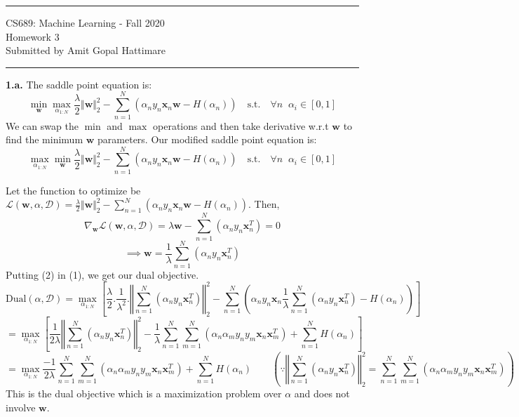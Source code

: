 \documentclass[11pt]{article}
\newcommand{\mbf}[1]{{\mathbf{#1}}}
\begin{document}
{\centering
  \rule{6.3in}{2pt}
  \vspace{1em}
  {\Large
    CS689: Machine Learning - Fall 2020\\
    Homework 3\\
  }
  \vspace{1em}
  Submitted by Amit Gopal Hattimare \\
  \vspace{0.1em}
  \rule{6.3in}{1.5pt}
}
\vspace{1pc}

\textbf{1.a.}
The saddle point equation is:
$$
	\min_{\mbf{w}}\max_{\alpha_{1:N}} \frac{\lambda}{2} \Vert\mbf{w}\Vert_2^2 - \sum_{n=1}^{N}(\alpha_n y_n \mbf{x}_n \mbf{w} - H(\alpha_n)) \quad \mbox{s.t.} \quad \forall n \;\; \alpha_i \in [0, 1]  
$$
We can swap the $\min$ and $\max$ operations and then take derivative w.r.t $\mbf{w}$ to find the minimum $\mbf{w}$ parameters. Our modified saddle point equation is:
\begin{equation}
	\max_{\alpha_{1:N}} \min_{\mbf{w}} \frac{\lambda}{2} \Vert\mbf{w}\Vert_2^2 - \sum_{n=1}^{N}(\alpha_n y_n \mbf{x}_n \mbf{w} - H(\alpha_n)) \quad \mbox{s.t.} \quad \forall n \;\; \alpha_i \in [0, 1]  
\end{equation}

Let the function to optimize be $\mathcal{L}(\mbf{w}, \alpha, \mathcal{D}) = \frac{\lambda}{2} \Vert\mbf{w}\Vert_2^2 - \sum_{n=1}^{N}(\alpha_n y_n \mbf{x}_n \mbf{w} - H(\alpha_n))$. Then,
$$
	\nabla_\mbf{w}\mathcal{L}(\mbf{w}, \alpha, \mathcal{D}) = \lambda\mbf{w} - \sum_{n=1}^{N}(\alpha_n y_n \mbf{x}_n^T) = 0
$$
\begin{equation}
	\implies \mbf{w} = \frac{1}{\lambda} \sum_{n=1}^{N}(\alpha_n y_n \mbf{x}_n^T)
\end{equation}
Putting (2) in (1), we get our dual objective.
$$
	\mbox{Dual}(\alpha, \mathcal{D}) = \max_{\alpha_{1:N}} \left[ \frac{\lambda}{2}.\frac{1}{\lambda^2}.\left\Vert \sum_{n=1}^{N}(\alpha_n y_n \mbf{x}_n^T) \right\Vert_2^2 - \sum_{n=1}^{N}\left( \alpha_n y_n \mbf{x}_n \frac{1}{\lambda} \sum_{n=1}^{N}(\alpha_n y_n \mbf{x}_n^T) - H(\alpha_n) \right) \right]
$$
$$
	= \max_{\alpha_{1:N}} \left[ \frac{1}{2\lambda} \left\Vert \sum_{n=1}^{N}(\alpha_n y_n \mbf{x}_n^T) \right\Vert_2^2 - \frac{1}{\lambda} \sum_{n=1}^{N} \sum_{m=1}^{N} ( \alpha_n\alpha_my_ny_m\mbf{x}_n\mbf{x}_m^T) + \sum_{n=1}^{N}H(\alpha_n) \right]
$$
$$
	= \max_{\alpha_{1:N}} \frac{-1}{2\lambda} \sum_{n=1}^{N} \sum_{m=1}^{N} ( \alpha_n\alpha_my_ny_m\mbf{x}_n\mbf{x}_m^T) + \sum_{n=1}^{N}H(\alpha_n)	\qquad \left(\because \left\Vert \sum_{n=1}^{N}(\alpha_n y_n \mbf{x}_n^T) \right\Vert_2^2 = \sum_{n=1}^{N} \sum_{m=1}^{N} ( \alpha_n\alpha_my_ny_m\mbf{x}_n\mbf{x}_m^T) \right)
$$
This is the dual objective which is a maximization problem over $\alpha$ and does not involve $\mbf{w}$. \\
\end{document}
